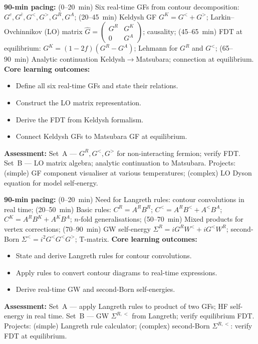 \documentclass[11pt,a4paper]{article}
\begin{document}
\medskip

\begin{tcolorbox}[modulebox, title={Module~II.5 --- Lecture L03: Contour-Ordered Green's Functions}]
\textbf{90-min pacing:} (0--20~min) Six real-time GFs from contour decomposition: $G^c,G^{\bar c},G^<,G^>,G^R,G^A$; (20--45~min) Keldysh GF $G^K=G^<+G^>$; Larkin--Ovchinnikov (LO) matrix $\hat{G}=\begin{pmatrix}G^R&G^K\\0&G^A\end{pmatrix}$; causality; (45--65~min) FDT at equilibrium: $G^K=(1-2f)(G^R-G^A)$; Lehmann for $G^R$ and $G^<$; (65--90~min) Analytic continuation Keldysh$\to$Matsubara; connection at equilibrium.
\medskip\textbf{Core learning outcomes:}
\begin{itemize}[leftmargin=1.4em,topsep=2pt,itemsep=1pt]
  \item Define all six real-time GFs and state their relations.
  \item Construct the LO matrix representation.
  \item Derive the FDT from Keldysh formalism.
  \item Connect Keldysh GFs to Matsubara GF at equilibrium.
\end{itemize}
\medskip\textbf{Assessment:}
Set~A --- $G^R,G^<,G^>$ for non-interacting fermion; verify FDT.
Set~B --- LO matrix algebra; analytic continuation to Matsubara.
Projects: (simple) GF component visualiser at various temperatures; (complex) LO Dyson equation for model self-energy.
\end{tcolorbox}

\medskip

\begin{tcolorbox}[modulebox, title={Module~II.5 --- Lecture L04: Langreth Rules}]
\textbf{90-min pacing:} (0--20~min) Need for Langreth rules: contour convolutions in real time; (20--50~min) Basic rules: $C^R=A^R B^R$; $C^<=A^R B^<+A^< B^A$; $C^K=A^R B^K+A^K B^A$; $n$-fold generalisations; (50--70~min) Mixed products for vertex corrections; (70--90~min) GW self-energy $\Sigma^R=iG^RW^<+iG^<W^R$; second-Born $\Sigma^<=i^2G^<G^<G^>$; T-matrix.
\medskip\textbf{Core learning outcomes:}
\begin{itemize}[leftmargin=1.4em,topsep=2pt,itemsep=1pt]
  \item State and derive Langreth rules for contour convolutions.
  \item Apply rules to convert contour diagrams to real-time expressions.
  \item Derive real-time GW and second-Born self-energies.
\end{itemize}
\medskip\textbf{Assessment:}
Set~A --- apply Langreth rules to product of two GFs; HF self-energy in real time.
Set~B --- GW $\Sigma^{R,<}$ from Langreth; verify equilibrium FDT.
Projects: (simple) Langreth rule calculator; (complex) second-Born $\Sigma^{R,<}$: verify FDT at equilibrium.
\end{tcolorbox}
\end{document}
